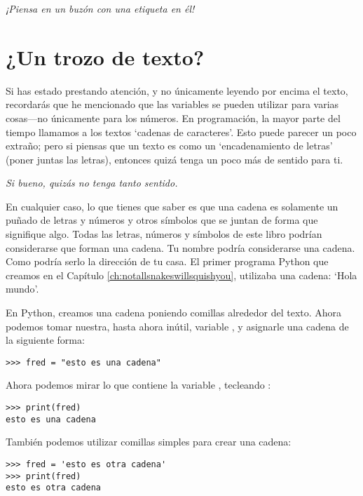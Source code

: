 \noindent
\emph{¡Piensa en un buzón con una etiqueta en él!}

\section{¿Un trozo de texto?}

Si has estado prestando atención, y no únicamente leyendo por encima el texto, recordarás que he mencionado que las variables se pueden utilizar para varias cosas---no únicamente para los números. En programación, la mayor parte del tiempo llamamos a los textos `cadenas de caracteres'. Esto puede parecer un poco extraño; pero si piensas que un texto es como un `encadenamiento de letras' (poner juntas las letras), entonces quizá tenga un poco más de sentido para ti.

\noindent
\emph{Si bueno, quizás no tenga tanto sentido.}

En cualquier caso, lo que tienes que saber es que una cadena es solamente un puñado de letras y números y otros símbolos que se juntan de forma que signifique algo. Todas las letras, números y símbolos de este libro podrían considerarse que forman una cadena. Tu nombre podría considerarse una cadena. Como podría serlo la dirección de tu casa.  El primer programa Python que creamos en el Capítulo \ref{ch:notallsnakeswillsquishyou}, utilizaba una cadena: `Hola mundo'.
\par
En Python, creamos una cadena poniendo comillas alrededor del texto. Ahora podemos tomar nuestra, hasta ahora inútil, variable , y asignarle una cadena de la siguiente forma:

\begin{listing}
\begin{verbatim}
>>> fred = "esto es una cadena"
\end{verbatim}
\end{listing}

\noindent
Ahora podemos mirar lo que contiene la variable , tecleando :

\begin{listing}
\begin{verbatim}
>>> print(fred)
esto es una cadena
\end{verbatim}
\end{listing}

\noindent
También podemos utilizar comillas simples para crear una cadena:

\begin{listing}
\begin{verbatim}
>>> fred = 'esto es otra cadena'
>>> print(fred)
esto es otra cadena
\end{verbatim}
\end{listing}

